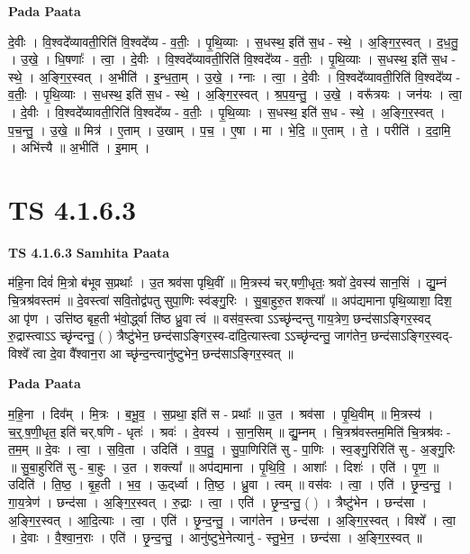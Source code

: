 \documentclass[17pt]{extarticle}
\begin{document}
\textbf{Pada Paata} \newline

दे॒वीः । वि॒श्वदे᳚व्यावती॒रिति॑ वि॒श्वदे᳚व्य - व॒तीः॒ । पृ॒थि॒व्याः । स॒धस्थ॒ इति॑ स॒ध - स्थे॒ । अ॒ङ्गि॒र॒स्वत् । द॒ध॒तु॒ । उ॒खे॒ । धि॒षणाः᳚ । त्वा॒ । दे॒वीः । वि॒श्वदे᳚व्यावती॒रिति॑ वि॒श्वदे᳚व्य - व॒तीः॒ । पृ॒थि॒व्याः । स॒धस्थ॒ इति॑ स॒ध - स्थे॒ । अ॒ङ्गि॒र॒स्वत् । अ॒भीति॑ । इ॒न्ध॒ता॒म् । उ॒खे॒ । ग्नाः । त्वा॒ । दे॒वीः । वि॒श्वदे᳚व्यावती॒रिति॑ वि॒श्वदे᳚व्य - व॒तीः॒ । पृ॒थि॒व्याः । स॒धस्थ॒ इति॑ स॒ध - स्थे॒ । अ॒ङ्गि॒र॒स्वत् । श्र॒प॒य॒न्तु॒ । उ॒खे॒ । वरू᳚त्रयः । जन॑यः । त्वा॒ । दे॒वीः । वि॒श्वदे᳚व्यावती॒रिति॑ वि॒श्वदे᳚व्य - व॒तीः॒ । पृ॒थि॒व्याः । स॒धस्थ॒ इति॑ स॒ध - स्थे॒ । अ॒ङ्गि॒र॒स्वत् । प॒च॒न्तु॒ । उ॒खे॒ ॥ मित्र॑ । ए॒ताम् । उ॒खाम् । प॒च॒ । ए॒षा । मा । भे॒दि॒ ॥ ए॒ताम् । ते॒ । परीति॑ । द॒दा॒मि॒ । अभि॑त्त्यै ॥ अ॒भीति॑ । इ॒माम् ।  \newline




\section*{ TS 4.1.6.3 }

\textbf{TS 4.1.6.3 } \newline
\textbf{Samhita Paata} \newline

म॑हि॒ना दिवं॑ मि॒त्रो ब॑भूव स॒प्रथाः᳚ । उ॒त श्रव॑सा पृथि॒वीं ॥ मि॒त्रस्य॑ चर्.षणी॒धृतः॒ श्रवो॑ दे॒वस्य॑ सान॒सिं । द्यु॒म्नं चि॒त्रश्र॑वस्तमं ॥ दे॒वस्त्वा॑ सवि॒तोद्व॑पतु सुपा॒णिः स्व॑ङ्गु॒रिः । सु॒बा॒हुरु॒त शक्त्या᳚ ॥ अप॑द्यमाना पृथि॒व्याशा॒ दिश॒ आ पृ॑ण । उत्ति॑ष्ठ बृह॒ती भ॑वो॒र्द्ध्वा ति॑ष्ठ ध्रु॒वा त्वं ॥ वस॑व॒स्त्वा ऽऽच्छृ॑न्दन्तु गाय॒त्रेण॒ छन्द॑साऽङ्गिर॒स्वद् रु॒द्रास्त्वाऽऽ च्छृ॑न्दन्तु॒ ( ) त्रैष्टु॑भेन॒ छन्द॑साऽङ्गिर॒स्व-दा॑दि॒त्यास्त्वा ऽऽच्छृ॑न्दन्तु॒ जाग॑तेन॒ छन्द॑साऽङ्गिर॒स्वद्-विश्वे᳚ त्वा दे॒वा वै᳚श्वान॒रा आ च्छृ॑न्द॒न्त्वानु॑ष्टुभेन॒ छन्द॑साऽङ्गिर॒स्वत् ॥ \newline

\textbf{Pada Paata} \newline

म॒हि॒ना । दिव᳚म् । मि॒त्रः । ब॒भू॒व॒ । स॒प्रथा॒ इति॑ स - प्रथाः᳚ ॥ उ॒त । श्रव॑सा । पृ॒थि॒वीम् ॥ मि॒त्रस्य॑ । च॒र्॒.ष॒णी॒धृत॒ इति॑ चर्.षणि - धृतः॑ । श्रवः॑ । दे॒वस्य॑ । सा॒न॒सिम् ॥ द्यु॒म्नम् । चि॒त्रश्र॑वस्तम॒मिति॑ चि॒त्रश्र॑वः - त॒म॒म् ॥ दे॒वः । त्वा॒ । स॒वि॒ता । उदिति॑ । व॒प॒तु॒ । सु॒पा॒णिरिति॑ सु - पा॒णिः । स्व॒ङ्गु॒रिरिति॑ सु - अ॒ङ्गु॒रिः ॥ सु॒बा॒हुरिति॑ सु - बा॒हुः । उ॒त । शक्त्या᳚ ॥ अप॑द्यमाना । पृ॒थि॒वि॒ । आशाः᳚ । दिशः॑ । एति॑ । पृ॒ण॒ ॥ उदिति॑ । ति॒ष्ठ॒ । बृ॒ह॒ती । भ॒व॒ । ऊ॒द्‌र्ध्वा । ति॒ष्ठ॒ । ध्रु॒वा । त्वम् ॥ वस॑वः । त्वा॒ । एति॑ । छृ॒न्द॒न्तु॒ । गा॒य॒त्रेण॑ । छन्द॑सा । अ॒ङ्गि॒र॒स्वत् । रु॒द्राः । त्वा॒ । एति॑ । छृ॒न्द॒न्तु॒ ( ) । त्रैष्टु॑भेन । छन्द॑सा । अ॒ङ्गि॒र॒स्वत् । आ॒दि॒त्याः । त्वा॒ । एति॑ । छृ॒न्द॒न्तु॒ । जाग॑तेन । छन्द॑सा । अ॒ङ्गि॒र॒स्वत् । विश्वे᳚ । त्वा॒ । दे॒वाः । वै॒श्वा॒न॒राः । एति॑ । छृ॒न्द॒न्तु॒ । आनु॑ष्टुभे॒नेत्यानु॑ - स्तु॒भे॒न॒ । छन्द॑सा । अ॒ङ्गि॒र॒स्वत् ॥  \newline
\end{document}
